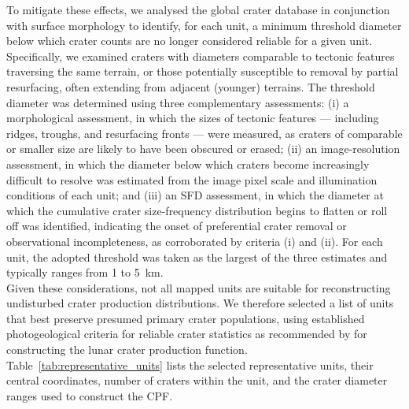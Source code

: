 \documentclass[preprint,11pt,3p,times,authoryear]{elsarticle}
\begin{document}
To mitigate these effects, we analysed the global crater database in conjunction with surface morphology to identify, for each unit, a minimum threshold diameter below which crater counts are no longer considered reliable for a given unit. Specifically, we examined craters with diameters comparable to tectonic features traversing the same terrain, or those potentially susceptible to removal by partial resurfacing, often extending from adjacent (younger) terrains.
The threshold diameter was determined using three complementary assessments: (i) a morphological assessment, in which the sizes of tectonic features --- including ridges, troughs, and resurfacing fronts --- were measured, as craters of comparable or smaller size are likely to have been obscured or erased; 
(ii) an image-resolution assessment, in which the diameter below which craters become increasingly difficult to resolve was estimated from the image pixel scale and illumination conditions of each unit; 
and (iii) an SFD assessment, in which the diameter at which the cumulative crater size-frequency distribution begins to flatten or roll off was identified, indicating the onset of preferential crater removal or observational incompleteness, as corroborated by criteria (i) and (ii). For each unit, the adopted threshold was taken as the largest of the three estimates and typically ranges from 1 to 5~km.\\

Given these considerations, not all mapped units are suitable for reconstructing undisturbed crater production distributions. We therefore selected a list of units that best preserve presumed primary crater populations, using established photogeological criteria for reliable crater statistics as recommended by \citet{Neukum1983} for constructing the lunar crater production function.
Table~\ref{tab:representative_units} lists the selected representative units, their central coordinates, number of craters within the unit, and the crater diameter ranges used to construct the CPF.\\
\end{document}
